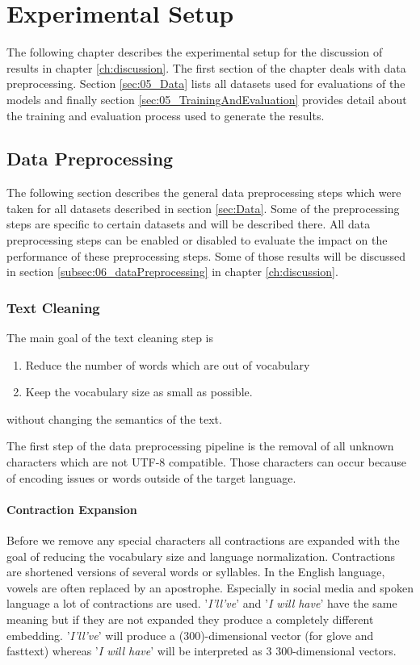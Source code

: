 \chapter{Experimental Setup}
\label{ch:setup}

The following chapter describes the experimental setup for the discussion of results in chapter \ref{ch:discussion}. The first section of the chapter deals with data preprocessing. Section \ref{sec:05_Data} lists all datasets used for evaluations of the models and finally section \ref{sec:05_TrainingAndEvaluation} provides detail about the training and evaluation process used to generate the results.

\section{Data Preprocessing}
The following section describes the general data preprocessing steps which were taken for all datasets described in section \ref{sec:Data}. Some of the preprocessing steps are specific to certain datasets and will be described there. All data preprocessing steps can be enabled or disabled to evaluate the impact on the performance of these preprocessing steps. Some of those results will be discussed in section \ref{subsec:06_dataPreprocessing} in chapter \ref{ch:discussion}.

\subsection{Text Cleaning}
The main goal of the text cleaning step is 
\begin{enumerate}
	\item Reduce the number of words which are out of vocabulary
	\item Keep the vocabulary size as small as possible.
\end{enumerate}

without changing the semantics of the text.


The first step of the data preprocessing pipeline is the removal of all unknown characters which are not UTF-8 compatible. Those characters can occur because of encoding issues or words outside of the target language. 
\subsubsection*{Contraction Expansion}

Before we remove any special characters all contractions are expanded with the goal of reducing the vocabulary size and language normalization. Contractions are shortened versions of several words or syllables. In the English language, vowels are often replaced by an apostrophe.  Especially in social media and spoken language a lot of contractions are used. '\textit{I'll've}' and '\textit{I will have}' have the same meaning but if they are not expanded they produce a completely different embedding. '\textit{I'll've}' will produce a (300)-dimensional vector (for glove and fasttext) whereas '\textit{I will have}' will be interpreted as 3 300-dimensional vectors.


